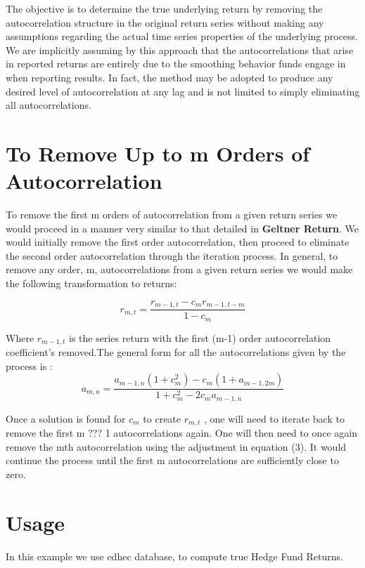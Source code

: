 \documentclass[12pt,letterpaper,english]{article}
\begin{document}
The objective is to determine the true underlying return by removing the
autocorrelation structure in the original return series without making any assumptions regarding the actual time series properties of the underlying process. We are implicitly assuming by this approach that the autocorrelations that arise in reported returns are entirely due to the smoothing behavior funds engage in when reporting results. In fact, the method may be adopted to produce any desired level of autocorrelation at any lag and is not limited to simply eliminating all autocorrelations.

\section{To Remove Up to m Orders of Autocorrelation}
To remove the first m orders of autocorrelation from a given return series we would proceed in a manner very similar to that detailed in \textbf{Geltner Return}. We would initially remove the first order autocorrelation, then proceed to eliminate the second order autocorrelation through the iteration process. In general, to remove any order, m, autocorrelations from a given return series we would make the following transformation to returns:

\begin{equation}
r_{m,t}=\frac{r_{m-1,t}-c_{m}r_{m-1,t-m}}{1-c_{m}}
\end{equation}

Where  \(r_{m-1,t}\) is the series return with the first (m-1) order autocorrelation coefficient's removed.The general form for all the autocorrelations given by the process is : 
\begin{equation}
a_{m,n}=\frac{a_{m-1,n}(1+c_{m}^2)-c_{m}(1+a_{m-1,2m})}{1+c_{m}^2 -2c_{m}a_{m-1,n}}
\end{equation}

Once a solution is found for \(c_{m}\) to create \(r_{m,t}\) , one will need to iterate back to remove the first m ??? 1  autocorrelations again. One will then need to once again remove the mth autocorrelation using the adjustment in equation (3). It would continue the process until the first m autocorrelations are sufficiently close to zero.

\section{Usage}

In this example we use edhec database, to compute true Hedge Fund Returns.
\end{document}
